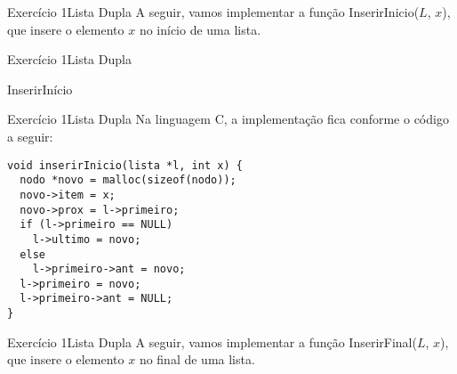\documentclass[aspectratio=169]{beamer}
\begin{document}

\begin{frame}[fragile]{Exercício 1}{Lista Dupla}
A seguir, vamos implementar a função InserirInicio($L$, $x$), que insere o elemento $x$ no início de uma lista.
\end{frame}


\begin{frame}[fragile]{Exercício 1}{Lista Dupla}
\begin{algorithm}[H]
\caption{InserirInício} 
\label{ListaDuplaInserirInicio}
\end{algorithm}
\end{frame}


\begin{frame}[fragile]{Exercício 1}{Lista Dupla}
Na linguagem C, a implementação fica conforme o código a seguir:
\begin{lstlisting}[style=CStyle]
void inserirInicio(lista *l, int x) {
  nodo *novo = malloc(sizeof(nodo));
  novo->item = x;
  novo->prox = l->primeiro;
  if (l->primeiro == NULL)
    l->ultimo = novo;
  else
    l->primeiro->ant = novo;
  l->primeiro = novo;
  l->primeiro->ant = NULL;
}
\end{lstlisting}  
\end{frame}


\begin{frame}[fragile]{Exercício 1}{Lista Dupla}
A seguir, vamos implementar a função InserirFinal($L$, $x$), que insere o elemento $x$ no final de uma lista.
\end{frame}
\end{document}
